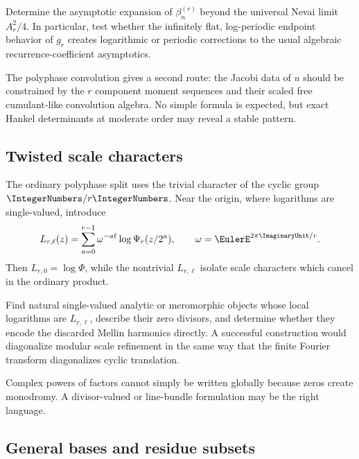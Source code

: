 \documentclass[11pt]{article}
\theoremstyle{definition}
\theoremstyle{remark}
\begin{document}
\begin{openproblem}
Determine the asymptotic expansion of $\beta_n^{(r)}$ beyond the universal
Nevai limit $A_r^2/4$.  In particular, test whether the infinitely flat,
log-periodic endpoint behavior of $g_r$ creates logarithmic or periodic
corrections to the usual algebraic recurrence-coefficient asymptotics.
\end{openproblem}

The polyphase convolution gives a second route: the Jacobi data of $u$ should
be constrained by the $r$ component moment sequences and their scaled free
cumulant-like convolution algebra.  No simple formula is expected, but exact
Hankel determinants at moderate order may reveal a stable pattern.

\subsection{Twisted scale characters}

The ordinary polyphase split uses the trivial character of the cyclic group
$\IntegerNumbers/r\IntegerNumbers$.  Near the origin, where logarithms are single-valued, introduce
\begin{equation}
 L_{r,\ell}(z)=\sum_{a=0}^{r-1}\omega^{-a\ell}
 \log\Psi_r(z/2^a),
 \qquad \omega=\EulerE^{2\pi\ImaginaryUnit/r}.                            \label{p5:eq:twisted-scale-log}
\end{equation}
Then $L_{r,0}=\log\Phi$, while the nontrivial $L_{r,\ell}$ isolate scale
characters which cancel in the ordinary product.

\begin{openproblem}
Find natural single-valued analytic or meromorphic objects whose local
logarithms are $L_{r,\ell}$, describe their zero divisors, and determine whether
they encode the discarded Mellin harmonics directly.  A successful construction
would diagonalize modular scale refinement in the same way that the finite
Fourier transform diagonalizes cyclic translation.
\end{openproblem}

Complex powers of factors cannot simply be written globally because zeros
create monodromy.  A divisor-valued or line-bundle formulation may be the right
language.

\subsection{General bases and residue subsets}
\end{document}

